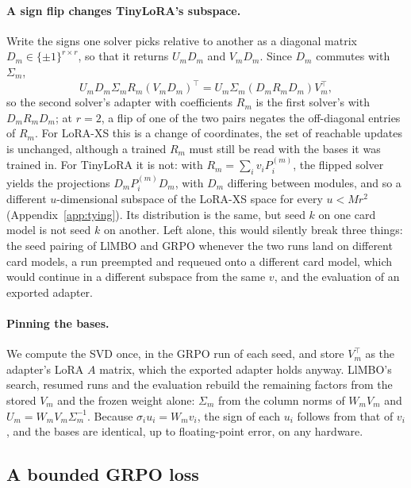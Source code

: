 \documentclass[twoside]{article}
\newcommand{\llmbo}{LlMBO}
\begin{document}
\paragraph{A sign flip changes TinyLoRA's subspace.}
Write the signs one solver picks relative to another as a diagonal matrix $D_m \in \{\pm 1\}^{r \times r}$, so that it returns $U_m D_m$ and $V_m D_m$. Since $D_m$ commutes with $\Sigma_m$,
\begin{equation}
    U_m D_m \Sigma_m R_m (V_m D_m)^\top = U_m \Sigma_m (D_m R_m D_m) V_m^\top,
\end{equation}
so the second solver's adapter with coefficients $R_m$ is the first solver's with $D_m R_m D_m$; at $r = 2$, a flip of one of the two pairs negates the off-diagonal entries of $R_m$. For LoRA-XS this is a change of coordinates, the set of reachable updates is unchanged, although a trained $R_m$ must still be read with the bases it was trained in. For TinyLoRA it is not: with $R_m = \sum_i v_i P^{(m)}_i$, the flipped solver yields the projections $D_m P^{(m)}_i D_m$, with $D_m$ differing between modules, and so a different $u$-dimensional subspace of the LoRA-XS space for every $u < M r^2$ (Appendix~\ref{app:tying}). Its distribution is the same, but seed $k$ on one card model is not seed $k$ on another. Left alone, this would silently break three things: the seed pairing of \llmbo{} and GRPO whenever the two runs land on different card models, a run preempted and requeued onto a different card model, which would continue in a different subspace from the same $v$, and the evaluation of an exported adapter.

\paragraph{Pinning the bases.}
We compute the SVD once, in the GRPO run of each seed, and store $V_m^\top$ as the adapter's LoRA $A$ matrix, which the exported adapter holds anyway. \llmbo{}'s search, resumed runs and the evaluation rebuild the remaining factors from the stored $V_m$ and the frozen weight alone: $\Sigma_m$ from the column norms of $W_m V_m$ and $U_m = W_m V_m \Sigma_m^{-1}$. Because $\sigma_i u_i = W_m v_i$, the sign of each $u_i$ follows from that of $v_i$, and the bases are identical, up to floating-point error, on any hardware.

\subsection{A bounded GRPO loss}
\label{app:dual-clip}
\end{document}

